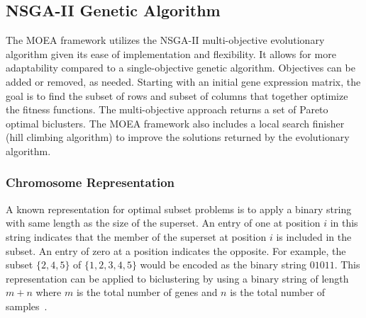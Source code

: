 
\subsection{NSGA-II Genetic Algorithm}
% 
The MOEA framework utilizes the NSGA-II multi-objective evolutionary algorithm \cite{deb2002fast} given its ease of implementation and flexibility.
It allows for more adaptability compared to a single-objective genetic algorithm. Objectives can be added or removed, as needed. 
Starting with an initial gene expression matrix, the goal is to find the subset of rows and subset of columns that together optimize the fitness functions.
The multi-objective approach returns a set of Pareto optimal biclusters. The MOEA framework also includes a local search finisher (hill climbing algorithm) to improve the solutions returned by the evolutionary algorithm. 

\subsubsection*{Chromosome Representation}
A known representation for optimal subset problems is to apply a binary string with same length as the size of the superset.
An entry of one at position $i$ in this string indicates that the member of the superset at position $i$ is included in the subset.
An entry of zero at a position indicates the opposite.
For example, the subset $\{2, 4, 5\}$ of $\{1, 2, 3, 4, 5\}$ would be encoded as the binary string $01011$.
This representation can be applied to biclustering by using a binary string of length $m+n$ where $m$ is the total number of genes and $n$ is the total number of samples~\cite{mitra2006multi}.

